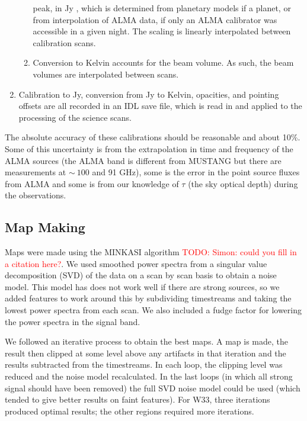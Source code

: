 \documentclass[twocolumn]{aastex62}
\def\todo#1{{\textcolor{red}{TODO: #1}}}
\begin{document}
\begin{enumerate}
\begin{enumerate}
                peak, in Jy \perbeam, which is determined from planetary models
                if a planet, or from interpolation of ALMA data, if only an
                ALMA calibrator was accessible in a given night. The scaling is
                linearly interpolated between calibration scans.
            \item Conversion to Kelvin accounts for the beam volume. As such,
                the beam volumes are interpolated between scans.
        \end{enumerate}
    \item Calibration to Jy, conversion from Jy \perbeam to Kelvin, opacities, and
        pointing offsets are all recorded in an IDL save file, which is read in
        and applied to the processing of the science scans.
\end{enumerate}

The absolute accuracy of these calibrations should be reasonable and about 10\%.
Some of this uncertainty is from the extrapolation in time and frequency of the ALMA
sources (the ALMA band is different from MUSTANG but there are measurements at
$\sim~100$ and 91 GHz), some is the error in the point source fluxes from ALMA and
some is from our knowledge of $\tau$ (the sky optical depth) during the observations.

\subsection{Map Making}
Maps were made using the MINKASI algorithm \citep{}\todo{Simon: could you fill
in a citation here?}.  We used smoothed power spectra from a singular value
decomposition (SVD) of the data on a scan by scan basis to
obtain a noise model.
This model has does not work well if there are strong sources,
so we added features to work around this by subdividing timestreams and taking
the lowest power spectra from each scan.  We also included a fudge factor for
lowering the power spectra in the signal band.

We followed an iterative process to obtain the best maps.  A map is made, the
result then clipped at some level above any artifacts in that iteration and the
results subtracted from the timestreams.  In each loop, the clipping level was
reduced and the noise model recalculated.  In the last loops (in which all
strong signal should have been removed) the full SVD noise model could be used
(which tended to give better results on faint features). For W33, three
iterations produced optimal results; the other regions required more
iterations.
\end{document}
